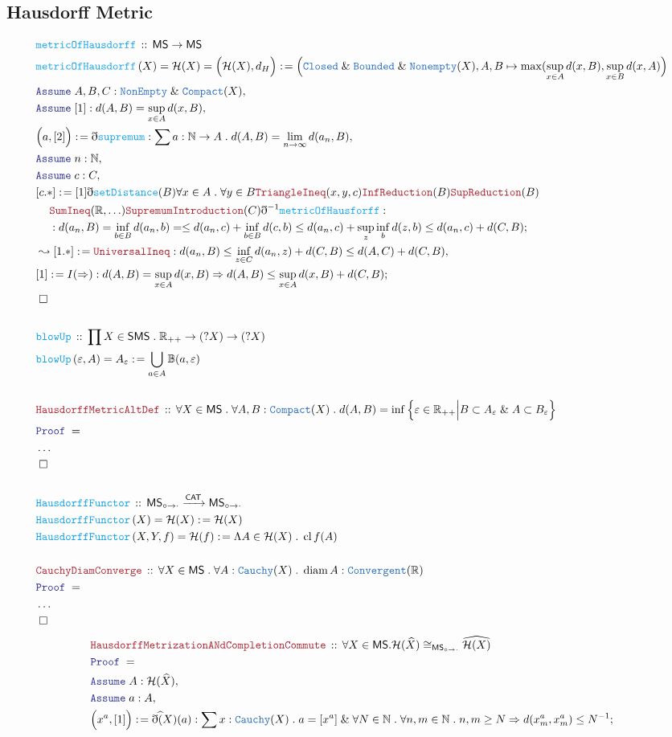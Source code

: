 \documentclass[12pt]{scrartcl}
\newcommand{\TYPE}[1]{\textcolor{NavyBlue}{\mathtt{#1}}}
\newcommand{\FUNC}[1]{\textcolor{Cerulean}{\mathtt{#1}}}
\newcommand{\LOGIC}[1]{\textcolor{Blue}{\mathtt{#1}}}
\newcommand{\THM}[1]{\textcolor{Maroon}{\mathtt{#1}}}
\renewcommand{\.}{\; . \;}
\newcommand{\de}{: \kern 0.1pc =}
\newcommand{\Act}[1]{\left( #1 \right)}
\newcommand{\Theorem}[2]{& \THM{#1} \, :: \, #2 \\ & \Proof = \\ }
\newcommand{\DeclareFunc}[2]{& \FUNC{#1} \, :: \, #2 \\}
\newcommand{\DefineNamedFunc}[4]{&  \FUNC{#1}\Act{#2} = #3 \de #4 \\}
\newcommand{\NewLine}{\\ & \kern 1pc}
\newcommand{\Page}[1]{ \begin{align*} #1 \end{align*}   }
\newcommand{ \bd }{ \ByDef }
\newcommand{\NoProof}{ & \ldots \\ \EndProof}
\renewcommand{\And}{\; \& \;}
\newcommand{\Imply}{\Rightarrow}
\newcommand{\Reals}{\mathbb{R} }
\newcommand{\Nat}{\mathbb{N} }
\newcommand{\Arrow}{\xrightarrow}
\newcommand{\Say}[3]{& #1 \de #2 : #3, \\}
\newcommand{\Conclude}[3]{& #1 \de #2 : #3; \\}
\newcommand{\Derive}[3]{& \leadsto #1 \de #2 : #3, \\}
\newcommand{\Assume}[2]{& \LOGIC{Assume} \; #1 : #2, \\}
\newcommand{\QED}{\; \square}
\newcommand{\EndProof}{& \QED \\}
\newcommand{\ByDef}{\eth}
\newcommand{\Proof}{\LOGIC{Proof} \; }
\newcommand{\CAT}{\mathsf{CAT}}
\DeclareMathOperator*{\cl}{cl}
\DeclareMathOperator{\diam}{diam}
\newcommand{\Iso}{\mathsf{MS}_{\circ \to \cdot}}
\newcommand{\SMS}{\mathsf{SMS}}
\newcommand{\MS}{\mathsf{MS}}
\begin{document}
\subsection{Hausdorff Metric}
\Page{
	\DeclareFunc{metricOfHausdorff}{\MS \to \MS}
	\DefineNamedFunc{metricOfHausdorff}{X}{\mathcal{H}(X) = \Big(\mathcal{H}(X),d_H \Big)}{\Big(\TYPE{Closed} \And \TYPE{Bounded} \And \TYPE{Nonempty}(X), A,B \mapsto \max(\sup_{x\in A} d(x,B ), \sup_{x \in B } d(x,A) \Big)}
	\Assume{A,B,C}{\TYPE{NonEmpty}\And \TYPE{Compact}(X)}
	\Assume{[1]}{d(A,B)    = \sup_{x \in A} d(x,B)}
	\Say{\Big(a,[2]\Big)}{\bd \FUNC{supremum}}{\sum a : \Nat \to A  \.  d(A,B) = \lim_{n \to \infty} d(a_n,B)}
	\Assume{n}{\Nat}
	\Assume{c}{C}
	\Conclude{[c.*]}{[1]\bd \FUNC{setDistance}(B) \forall x \in A \. \forall y \in B \THM{TriangleIneq}(x,y,c)
		 \THM{InfReduction}(B)  \THM{SupReduction}(B) \NewLine \THM{SumIneq}(\Reals,\ldots)\THM{SupremumIntroduction}(C)
		  \bd^{-1} \FUNC{metricOfHausforff}
	}
	{
		\NewLine :
		d(a_n, B) =
		\inf_{b \in B} d(a_n,b) =
		\le   d(a_n,c) + \inf_{b \in B} d(c,b) \le
		d(a_n,c)  + \sup_z \inf_b  d(z,b) \le
		d(a_n,c)  +  d(C,B)                              
 	}
 	\Derive{[1.*]}{\THM{UniversalIneq}}{   d(a_n,B)  \le   \inf_{z \in C} d(a_n,z) + d(C,B) \le d(A,C) + d(C,B)  }
 	\Conclude{[1]}{I(\Rightarrow) }{  d(A,B) = \sup_{x \in A} d(x,B) \Rightarrow d(A,B) \le \sup_{x \in A} d(x,B) + d(C,B) }
 	\EndProof
 	\\
 	\DeclareFunc{blowUp}{\prod X \in \SMS \. \Reals_{++} \to (?X) \to (?X)}
 	\DefineNamedFunc{blowUp}{\varepsilon,A}{A_{\varepsilon}}{\bigcup_{a \in A} \mathbb{B}(a,\varepsilon)}
 	\\
 	\Theorem{HausdorffMetricAltDef}{\forall X \in \MS \. \forall A,B : \TYPE{Compact}(X) \. d(A,B) = \inf\Big\{ \varepsilon \in \Reals_{++} \Big|   B \subset A_{\varepsilon} \And A \subset B_{\varepsilon} \Big\}}
 	\NoProof
 	\\
 	\DeclareFunc{HausdorffFunctor}{\Iso \Arrow{\CAT} \Iso}
 	\DefineNamedFunc{HausdorffFunctor}{X}{\mathcal{H}(X)}{\mathcal{H}(X)}
 	\DefineNamedFunc{HausdorffFunctor}{X,Y,f}{\mathcal{H}(f)}{\Lambda A \in \mathcal{H}(X) \.  \cl f(A)  }
 	\\
 	\Theorem{CauchyDiamConverge}{\forall X \in \MS \. \forall A : \TYPE{Cauchy}(X) \. \diam A : \TYPE{Convergent}(\Reals)}
 	\NoProof
}\Page{
	\Theorem{HausdorffMetrizationANdCompletionCommute}{\forall X \in \MS . \mathcal{H}(\widehat{X}) \cong_{\Iso} \widehat{\mathcal{H}(X)}}
 	\Assume{A}{\mathcal{H}(\widehat{X})}
 	\Assume{a}{A}
 	\Conclude{ \Big(x^a, [1]\Big)}{\bd \widehat(X)(a)}{\sum x : \TYPE{Cauchy}(X) \. a = [x^a] \And \forall N \in \Nat \. \forall n,m \in \Nat \. n,m \ge N \Imply d(x_m^a,x_m^a) \le N^{-1}}
}
\end{document}
